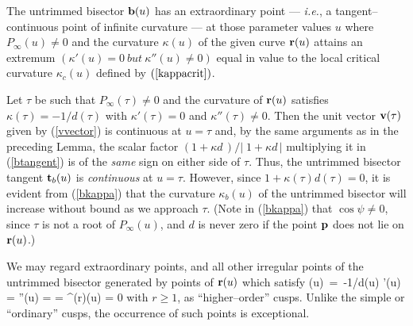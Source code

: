 \begin{lma}
The untrimmed bisector ${\bf b}(u)$ has an extraordinary point ---
{\it i.e.}, a tangent--continuous point of infinite curvature ---
at those parameter values $u$ where $P_\infty(u)\not=0$ and the
curvature $\kappa(u)$ of the given curve ${\bf r}(u)$ attains an
extremum $(\kappa'(u)=0\ but\ \kappa''(u)\not=0)$ equal in value
to the local critical curvature $\kappa_c(u)$ defined by $(\ref
{kappacrit})$.
\end{lma}

\prf Let $\tau$ be such that $P_\infty(\tau)\not=0$ and the curvature
of ${\bf r}(u)$ satisfies $\kappa(\tau)=-1/d(\tau)$ with $\kappa'(\tau)
=0$ and $\kappa''(\tau)\not=0$. Then the unit vector ${\bf v}(\tau)$
given by (\ref{vvector}) is continuous at $u=\tau$ and, by the same
arguments as in the preceding Lemma, the scalar factor $(1+\kappa d\,)
/|\;\!1+\kappa d\,|$ multiplying it in (\ref{btangent}) is of the {\it
same\/} sign on either side of $\tau$. Thus, the untrimmed bisector
tangent ${\bf t}_b(u)$ is {\it continuous\/} at $u=\tau$. However,
since $1+\kappa(\tau)d(\tau)=0$, it is evident from (\ref{bkappa})
that the curvature $\kappa_b(u)$ of the untrimmed bisector will
increase without bound as we approach $\tau$. (Note in (\ref{bkappa})
that $\cos\psi\not=0$, since $\tau$ is not a root of $P_\infty(u)$,
and $d$ is never zero if the point ${\bf p}$ does not lie on
${\bf r}(u)$.) \QED

We may regard extraordinary points, and all other irregular points
of the untrimmed bisector generated by points of ${\bf r}(u)$ which
satisfy
\be
\kappa(u) \,=\, -1/d(u)
 \quad
\kappa'(u) = \kappa''(u) = \cdots = \kappa^{(r)}(u) = 0
\ee
with $r \ge 1$, as ``higher--order'' cusps. Unlike the simple or
``ordinary'' cusps, the occurrence of such points is exceptional.

